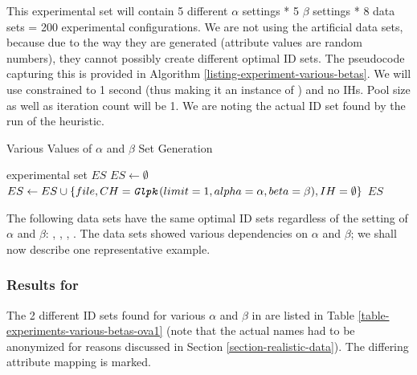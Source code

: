 This experimental set will contain 5 different $\alpha$ settings * 5 $\beta$ settings * 8 data sets = 200 experimental configurations. We are not using the artificial data sets, because due to the way they are generated (attribute values are random numbers), they cannot possibly create different optimal ID sets. The pseudocode capturing this is provided in Algorithm \ref{listing-experiment-various-betas}. We will use  constrained to 1 second (thus making it an instance of ) and no IHs. Pool size as well as iteration count will be 1. We are noting the actual ID set found by the run of the heuristic.\\

\begin{algorithm}
\caption{Various Values of $\alpha$ and $\beta$ Set Generation}
\label{listing-experiment-various-betas}
\begin{algorithmic}
\ENSURE experimental set $ES$
\STATE $ES \gets \emptyset$
    	\STATE $ES \gets ES \cup \{file, CH = \texttt{\textit{Glpk}}(limit = 1, alpha = \alpha, beta = \beta), IH = \emptyset\}$
    \ENDFOR
  \ENDFOR
\ENDFOR
\RETURN $ES$
\end{algorithmic}
\end{algorithm}

The following data sets have the same optimal ID sets regardless of the setting of $\alpha$ and $\beta$: , , , . The  data sets showed various dependencies on $\alpha$ and $\beta$; we shall now describe one representative example.

\subsubsection{Results for }

The 2 different ID sets found for various $\alpha$ and $\beta$ in  are listed in Table \ref{table-experiments-various-betas-ova1} (note that the actual names had to be anonymized for reasons discussed in Section \ref{section-realistic-data}). The differing attribute mapping is marked.

